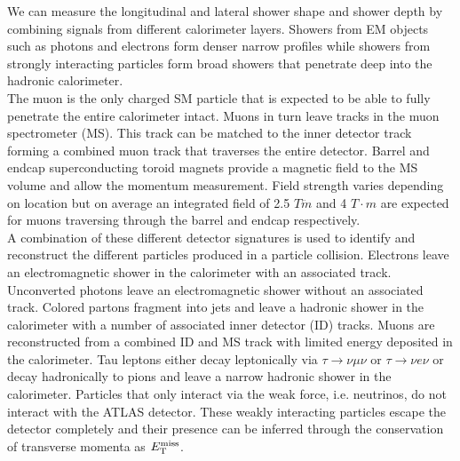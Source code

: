 
\indent We can measure the longitudinal and lateral shower shape and shower depth by combining signals from different calorimeter layers. Showers from EM objects such as photons and electrons form denser narrow profiles while showers from strongly interacting particles form broad showers that penetrate deep into the hadronic calorimeter. \\

\indent The muon is the only charged SM particle that is expected to be able to fully penetrate the entire calorimeter intact.  Muons in turn leave tracks in the muon spectrometer (MS).  This track can be matched to the inner detector track forming a combined muon track that traverses the entire detector.  Barrel and endcap superconducting toroid magnets provide a magnetic field to the MS volume and allow the momentum measurement.  Field strength varies depending on location but on average an integrated field of 2.5 $T\ddot m$ and 4 $T \cdot m$ are expected for muons traversing through the barrel and endcap respectively.\\

\indent A combination of these different detector signatures is used to identify and reconstruct the different particles produced in a particle collision.  Electrons leave an electromagnetic shower in the calorimeter with an associated track.  Unconverted photons leave an electromagnetic shower without an associated track.  Colored partons fragment into jets and leave a hadronic shower in the calorimeter with a number of associated inner detector (ID) tracks.  Muons are reconstructed from a combined ID and MS track with limited energy deposited in the calorimeter.  Tau leptons either decay leptonically via $\tau \rightarrow \nu \mu \nu$ or $\tau \rightarrow \nu e \nu$ or decay hadronically to pions and leave a narrow hadronic shower in the calorimeter.  Particles that only interact via the weak force, i.e. neutrinos, do not interact with the ATLAS detector.  These weakly interacting particles escape the detector completely and their presence can be inferred through the conservation of transverse momenta as $E_{\mathrm{T}}^{\mathrm{miss}}$.\\

